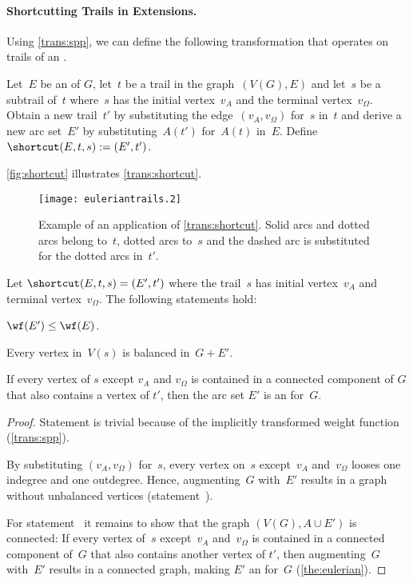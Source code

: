 \paragraph{Shortcutting Trails in \Eu Extensions.}Using \autoref{trans:spp}, we can define the following transformation that operates on trails of an \EE .\begin{transformation}\label{trans:shortcut}
  Let~$E$ be an \EE{} of $G$, let~$t$ be a trail in the graph~$(V(G), E)$ and let~$s$ be a subtrail of~$t$ where~$s$ has the initial vertex~$v_A$ and the terminal vertex~$v_\Omega$. Obtain a new trail~$t'$ by substituting the edge~$(v_A, v_\Omega)$ for~$s$ in~$t$ and derive a new arc set~$E'$ by substituting~$A(t')$ for~$A(t)$ in~$E$. Define~$\shortcut(E, t, s) := (E', t')$.
\end{transformation}
\autoref{fig:shortcut} illustrates \autoref{trans:shortcut}.
\begin{figure}
  \begin{center}
    \texttt{[image: euleriantrails.2]}
    \caption{Example of an application of \autoref{trans:shortcut}. Solid arcs and dotted arcs belong to~$t$, dotted arcs to~$s$ and the dashed arc is substituted for the dotted arcs in~$t'$.}
    \label{fig:shortcut}
  \end{center}
\end{figure}
\begin{lemma}\label{lem:shortcut}
  Let $\shortcut(E, t, s) = (E', t')$ where the trail~$s$ has initial vertex~$v_A$ and terminal vertex~$v_\Omega$. The following statements hold:
  \begin{lemenum}
  \item $\wf(E') \leq \wf(E)$. \label{enu:ls1}
  \item Every vertex in~$V(s)$ is balanced in~$G + E'$. \label{enu:ls4}
  \item If every vertex of $s$ except $v_A$ and $v_\Omega$ is contained in a connected component of $G$ that also contains a vertex of $t'$, then the arc set $E'$ is an \EE{} for~$G$. \label{enu:ls2}
\end{lemenum}
\end{lemma}
\begin{proof}
  Statement  is trivial because of the implicitly transformed weight function (\autoref{trans:spp}).
  
  By substituting $(v_A, v_\Omega)$ for~$s$, every vertex on~$s$ except~$v_A$ and~$v_\Omega$ looses one indegree and one outdegree. Hence, augmenting~$G$ with~$E'$ results in a graph without unbalanced vertices (statement~).

  For statement~ it remains to show that the graph $(V(G),A \cup E')$ is connected: If every vertex of~$s$ except~$v_A$ and~$v_\Omega$ is contained in a connected component of~$G$ that also contains another vertex of $t'$, then augmenting~$G$ with~$E'$ results in a connected graph, making $E'$ an \EE{} for~$G$ (\autoref{the:eulerian}).
\end{proof}
